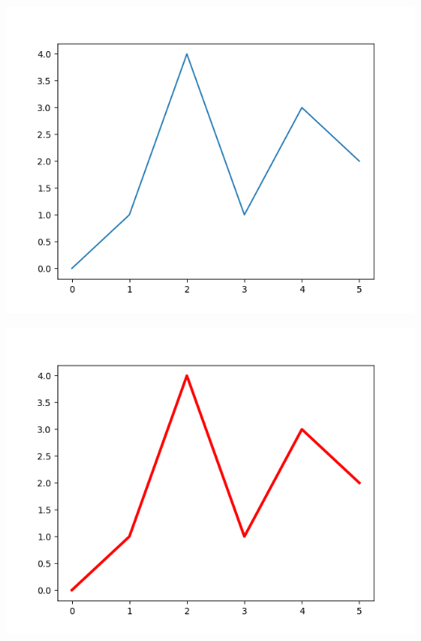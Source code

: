 \documentclass[11pt,class=report,crop=false]{standalone}
\begin{document}
\begin{minipage}{0.32\textwidth}
\begin{center}
\includegraphics[scale=\myscale,scale=0.35]{figures/pythonx-plot1}
\footnotesize {}
\end{center}
\end{minipage}
\begin{minipage}{0.32\textwidth}
\begin{center}
\includegraphics[scale=\myscale,scale=0.35]{figures/pythonx-plot2}
\footnotesize {}
\end{center}
\end{minipage}
\end{document}
